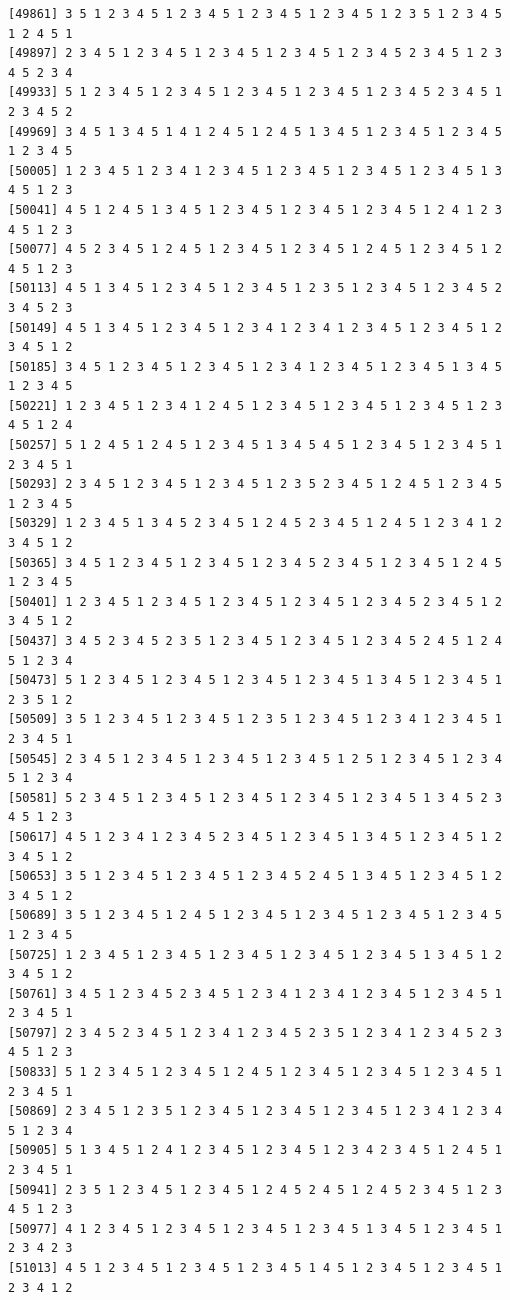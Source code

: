 \documentclass[
  english,
]{book}
\begin{document}
\begin{verbatim}
[49861] 3 5 1 2 3 4 5 1 2 3 4 5 1 2 3 4 5 1 2 3 4 5 1 2 3 5 1 2 3 4 5 1 2 4 5 1
[49897] 2 3 4 5 1 2 3 4 5 1 2 3 4 5 1 2 3 4 5 1 2 3 4 5 2 3 4 5 1 2 3 4 5 2 3 4
[49933] 5 1 2 3 4 5 1 2 3 4 5 1 2 3 4 5 1 2 3 4 5 1 2 3 4 5 2 3 4 5 1 2 3 4 5 2
[49969] 3 4 5 1 3 4 5 1 4 1 2 4 5 1 2 4 5 1 3 4 5 1 2 3 4 5 1 2 3 4 5 1 2 3 4 5
[50005] 1 2 3 4 5 1 2 3 4 1 2 3 4 5 1 2 3 4 5 1 2 3 4 5 1 2 3 4 5 1 3 4 5 1 2 3
[50041] 4 5 1 2 4 5 1 3 4 5 1 2 3 4 5 1 2 3 4 5 1 2 3 4 5 1 2 4 1 2 3 4 5 1 2 3
[50077] 4 5 2 3 4 5 1 2 4 5 1 2 3 4 5 1 2 3 4 5 1 2 4 5 1 2 3 4 5 1 2 4 5 1 2 3
[50113] 4 5 1 3 4 5 1 2 3 4 5 1 2 3 4 5 1 2 3 5 1 2 3 4 5 1 2 3 4 5 2 3 4 5 2 3
[50149] 4 5 1 3 4 5 1 2 3 4 5 1 2 3 4 1 2 3 4 1 2 3 4 5 1 2 3 4 5 1 2 3 4 5 1 2
[50185] 3 4 5 1 2 3 4 5 1 2 3 4 5 1 2 3 4 1 2 3 4 5 1 2 3 4 5 1 3 4 5 1 2 3 4 5
[50221] 1 2 3 4 5 1 2 3 4 1 2 4 5 1 2 3 4 5 1 2 3 4 5 1 2 3 4 5 1 2 3 4 5 1 2 4
[50257] 5 1 2 4 5 1 2 4 5 1 2 3 4 5 1 3 4 5 4 5 1 2 3 4 5 1 2 3 4 5 1 2 3 4 5 1
[50293] 2 3 4 5 1 2 3 4 5 1 2 3 4 5 1 2 3 5 2 3 4 5 1 2 4 5 1 2 3 4 5 1 2 3 4 5
[50329] 1 2 3 4 5 1 3 4 5 2 3 4 5 1 2 4 5 2 3 4 5 1 2 4 5 1 2 3 4 1 2 3 4 5 1 2
[50365] 3 4 5 1 2 3 4 5 1 2 3 4 5 1 2 3 4 5 2 3 4 5 1 2 3 4 5 1 2 4 5 1 2 3 4 5
[50401] 1 2 3 4 5 1 2 3 4 5 1 2 3 4 5 1 2 3 4 5 1 2 3 4 5 2 3 4 5 1 2 3 4 5 1 2
[50437] 3 4 5 2 3 4 5 2 3 5 1 2 3 4 5 1 2 3 4 5 1 2 3 4 5 2 4 5 1 2 4 5 1 2 3 4
[50473] 5 1 2 3 4 5 1 2 3 4 5 1 2 3 4 5 1 2 3 4 5 1 3 4 5 1 2 3 4 5 1 2 3 5 1 2
[50509] 3 5 1 2 3 4 5 1 2 3 4 5 1 2 3 5 1 2 3 4 5 1 2 3 4 1 2 3 4 5 1 2 3 4 5 1
[50545] 2 3 4 5 1 2 3 4 5 1 2 3 4 5 1 2 3 4 5 1 2 5 1 2 3 4 5 1 2 3 4 5 1 2 3 4
[50581] 5 2 3 4 5 1 2 3 4 5 1 2 3 4 5 1 2 3 4 5 1 2 3 4 5 1 3 4 5 2 3 4 5 1 2 3
[50617] 4 5 1 2 3 4 1 2 3 4 5 2 3 4 5 1 2 3 4 5 1 3 4 5 1 2 3 4 5 1 2 3 4 5 1 2
[50653] 3 5 1 2 3 4 5 1 2 3 4 5 1 2 3 4 5 2 4 5 1 3 4 5 1 2 3 4 5 1 2 3 4 5 1 2
[50689] 3 5 1 2 3 4 5 1 2 4 5 1 2 3 4 5 1 2 3 4 5 1 2 3 4 5 1 2 3 4 5 1 2 3 4 5
[50725] 1 2 3 4 5 1 2 3 4 5 1 2 3 4 5 1 2 3 4 5 1 2 3 4 5 1 3 4 5 1 2 3 4 5 1 2
[50761] 3 4 5 1 2 3 4 5 2 3 4 5 1 2 3 4 1 2 3 4 1 2 3 4 5 1 2 3 4 5 1 2 3 4 5 1
[50797] 2 3 4 5 2 3 4 5 1 2 3 4 1 2 3 4 5 2 3 5 1 2 3 4 1 2 3 4 5 2 3 4 5 1 2 3
[50833] 5 1 2 3 4 5 1 2 3 4 5 1 2 4 5 1 2 3 4 5 1 2 3 4 5 1 2 3 4 5 1 2 3 4 5 1
[50869] 2 3 4 5 1 2 3 5 1 2 3 4 5 1 2 3 4 5 1 2 3 4 5 1 2 3 4 1 2 3 4 5 1 2 3 4
[50905] 5 1 3 4 5 1 2 4 1 2 3 4 5 1 2 3 4 5 1 2 3 4 2 3 4 5 1 2 4 5 1 2 3 4 5 1
[50941] 2 3 5 1 2 3 4 5 1 2 3 4 5 1 2 4 5 2 4 5 1 2 4 5 2 3 4 5 1 2 3 4 5 1 2 3
[50977] 4 1 2 3 4 5 1 2 3 4 5 1 2 3 4 5 1 2 3 4 5 1 3 4 5 1 2 3 4 5 1 2 3 4 2 3
[51013] 4 5 1 2 3 4 5 1 2 3 4 5 1 2 3 4 5 1 4 5 1 2 3 4 5 1 2 3 4 5 1 2 3 4 1 2

\end{verbatim}
\end{document}
